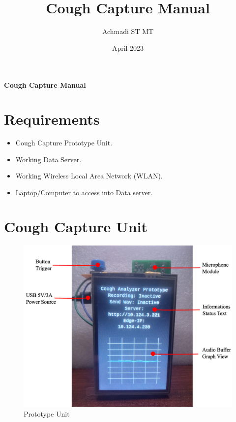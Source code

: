 \documentclass[a4paper,12pt,oneside,pdflatex,italian,final,twocolumn]{article}
\title{Cough Capture Manual}
\author{Achmadi ST MT}
\date{April 2023}
\begin{document}
	\pagestyle{fancy}

	\chead{\today}

	\onecolumn

	\begin{figure}

	\end{figure}\begin{minipage}{0.47\textwidth}
		\centering

	\end{minipage}
	\hfill
	\begin{minipage}{0.47\textwidth}
		\raggedleft
		\Huge \textbf{Cough Capture Manual}
	\end{minipage}

	\section{Requirements}

	\begin{itemize}
		\item Cough Capture Prototype Unit.

		\item Working Data Server.

		\item Working Wireless Local Area Network (WLAN).

		\item Laptop/Computer to access into Data server.
	\end{itemize}

	\raggedright
	\section{Cough Capture Unit}

	\centering
	\begin{figure}[!ht]
		\centering
		\includegraphics[width=\textwidth,]{images/proto_part.png}
		\caption{Prototype Unit}
	\end{figure}
\end{document}

